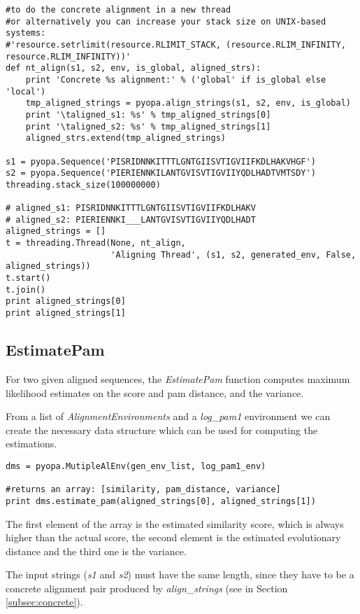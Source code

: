 \documentclass[12pt]{article}
\begin{document}
\begin{lstlisting}
#to do the concrete alignment in a new thread
#or alternatively you can increase your stack size on UNIX-based systems:
#'resource.setrlimit(resource.RLIMIT_STACK, (resource.RLIM_INFINITY, resource.RLIM_INFINITY))'
def nt_align(s1, s2, env, is_global, aligned_strs):
    print 'Concrete %s alignment:' % ('global' if is_global else 'local')
    tmp_aligned_strings = pyopa.align_strings(s1, s2, env, is_global)
    print '\taligned_s1: %s' % tmp_aligned_strings[0]
    print '\taligned_s2: %s' % tmp_aligned_strings[1]
    aligned_strs.extend(tmp_aligned_strings)

s1 = pyopa.Sequence('PISRIDNNKITTTLGNTGIISVTIGVIIFKDLHAKVHGF')
s2 = pyopa.Sequence('PIERIENNKILANTGVISVTIGVIIYQDLHADTVMTSDY')
threading.stack_size(100000000)

# aligned_s1: PISRIDNNKITTTLGNTGIISVTIGVIIFKDLHAKV
# aligned_s2: PIERIENNKI___LANTGVISVTIGVIIYQDLHADT
aligned_strings = []
t = threading.Thread(None, nt_align,
                     'Aligning Thread', (s1, s2, generated_env, False, aligned_strings))
t.start()
t.join()
print aligned_strings[0]
print aligned_strings[1]
\end{lstlisting}

\subsection{EstimatePam}
\label{subsec:EPam}

For two given aligned sequences, the \emph{EstimatePam} function computes maximum likelihood estimates on the score and pam distance, and the variance. 

From a list of \emph{AlignmentEnvironments} and a \emph{log\_pam1} environment we can create the necessary data structure which can be used for computing the estimations.

\begin{lstlisting}
dms = pyopa.MutipleAlEnv(gen_env_list, log_pam1_env)

#returns an array: [similarity, pam_distance, variance]
print dms.estimate_pam(aligned_strings[0], aligned_strings[1])

\end{lstlisting}

The first element of the array is the estimated similarity score, which is always higher than the actual score, the second element is the estimated evolutionary distance and the third one is the variance.

The input strings (\emph{s1} and \emph{s2}) must have the same length, since they have to be a concrete alignment pair produced by \emph{align\_strings} (see in Section \ref{subsec:concrete}).
\end{document}

